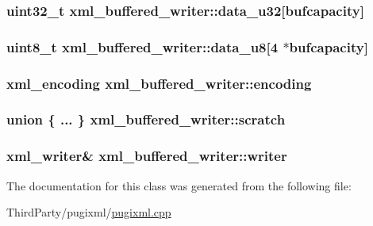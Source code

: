 \hypertarget{classxml__buffered__writer_afa54826d8227c4ee661e1a9cc1e1acf2}{
\subsubsection[{data\-\_\-u32}]{\setlength{\rightskip}{0pt plus 5cm}uint32\-\_\-t xml\-\_\-buffered\-\_\-writer\-::data\-\_\-u32\mbox{[}{\bf bufcapacity}\mbox{]}}}\label{classxml__buffered__writer_afa54826d8227c4ee661e1a9cc1e1acf2}
\hypertarget{classxml__buffered__writer_ac672c70ba0597cf94d35c352ac563891}{
\subsubsection[{data\-\_\-u8}]{\setlength{\rightskip}{0pt plus 5cm}uint8\-\_\-t xml\-\_\-buffered\-\_\-writer\-::data\-\_\-u8\mbox{[}4 $\ast${\bf bufcapacity}\mbox{]}}}\label{classxml__buffered__writer_ac672c70ba0597cf94d35c352ac563891}
\hypertarget{classxml__buffered__writer_ab810a7286598172e1549561b285f08fb}{
\subsubsection[{encoding}]{\setlength{\rightskip}{0pt plus 5cm}xml\-\_\-encoding xml\-\_\-buffered\-\_\-writer\-::encoding}}\label{classxml__buffered__writer_ab810a7286598172e1549561b285f08fb}
\hypertarget{classxml__buffered__writer_a74fd3d695095835afa0f7671ac33037c}{
\subsubsection[{scratch}]{\setlength{\rightskip}{0pt plus 5cm}union \{ ... \}   xml\-\_\-buffered\-\_\-writer\-::scratch}}\label{classxml__buffered__writer_a74fd3d695095835afa0f7671ac33037c}
\hypertarget{classxml__buffered__writer_a37cdd45f867937e1978565f5a0fa318b}{
\subsubsection[{writer}]{\setlength{\rightskip}{0pt plus 5cm}xml\-\_\-writer\& xml\-\_\-buffered\-\_\-writer\-::writer}}\label{classxml__buffered__writer_a37cdd45f867937e1978565f5a0fa318b}


The documentation for this class was generated from the following file\-:\begin{DoxyCompactItemize}
\item 
Third\-Party/pugixml/\hyperlink{pugixml_8cpp}{pugixml.\-cpp}\end{DoxyCompactItemize}
